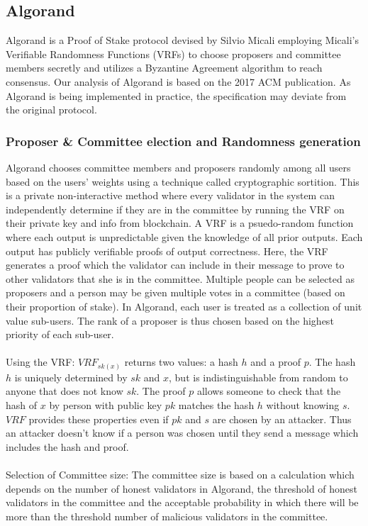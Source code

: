 \documentclass[10pt,journal,compsoc]{IEEEtran}
\begin{document}
\subsection{Algorand}
Algorand \cite{Gilad} is a Proof of Stake protocol devised by Silvio Micali employing Micali's Verifiable Randomness Functions (VRFs) to choose proposers and committee members secretly and utilizes a Byzantine Agreement algorithm to reach consensus. Our analysis of Algorand is based on the 2017 ACM publication. As Algorand is being implemented in practice, the specification may deviate from the original protocol.

\subsubsection{Proposer \& Committee election and Randomness generation}
Algorand chooses committee members and proposers randomly among all users based on the users’ weights using a technique called cryptographic sortition. This is a private non-interactive method where every validator in the system can independently determine if they are in the committee by running the VRF on their private key and info from blockchain. A VRF is a psuedo-random function where each output is unpredictable given the knowledge of all prior outputs. Each output has publicly verifiable proofs of output correctness. Here, the VRF generates a proof which the validator can include in their message to prove to other validators that she is in the committee. Multiple people can be selected as proposers and a person may be given multiple votes in a committee (based on their proportion of stake). In Algorand, each user is treated as a collection of unit value sub-users. The rank of a proposer is thus chosen based on the highest priority of each sub-user.
\\\\
Using the VRF: $VRF_{sk(x)}$ returns two values: a hash $h$ and a proof $p$. The hash $h$ is uniquely determined by $sk$ and $x$, but is indistinguishable from random to anyone that does not know $sk$. The proof $p$ allows someone to check that the hash of $x$ by person with public key $pk$ matches the hash $h$ without knowing $s$. $VRF$ provides these properties even if $pk$ and $s$ are chosen by an attacker. Thus an attacker doesn't know if a person was chosen until they send a message which includes the hash and proof. 
\\\\
Selection of Committee size: The committee size is based on a calculation which depends on the number of honest validators in Algorand, the threshold of honest validators in the committee and the acceptable probability in which there will be more than the threshold number of malicious validators in the committee. 
\end{document}
